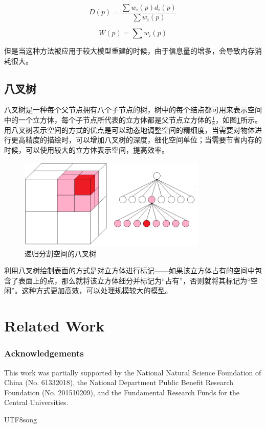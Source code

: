 \documentclass{llncs}
\begin{document}
\begin{CJK}{UTF8}{song}
\begin{equation}
\label{D_cal}
	D(p) = \frac{\sum w_i(p)d_i(p)}{\sum w_i(p)}
\end{equation}

\begin{equation}
\label{W_cal}
	W(p) = \sum w_i(p)
\end{equation}

但是当这种方法被应用于较大模型重建的时候，由于信息量的增多，会导致内存消耗很大。






\subsection{八叉树}
八叉树是一种每个父节点拥有八个子节点的树\cite{Wurm2010OctoMap}，树中的每个结点都可用来表示空间中的一个立方体，每个子节点所代表的立方体都是父节点立方体的$\frac{1}{8}$，如图\ref{Octree}所示。用八叉树表示空间的方式的优点是可以动态地调整空间的精细度，当需要对物体进行更高精度的描绘时，可以增加八叉树的深度，细化空间单位；当需要节省内存的时候，可以使用较大的立方体表示空间，提高效率。

\begin{figure}
\centering
\includegraphics[width=0.8\textwidth]{picts/octree.png}
\caption{递归分割空间的八叉树}
\label{Octree}
\end{figure}

利用八叉树绘制表面的方式是对立方体进行标记——如果该立方体占有的空间中包含了表面上的点，那么就将该立方体细分并标记为“占有”，否则就将其标记为“空闲”。这种方式更加高效，可以处理规模较大的模型。

\section{Related Work}


\subsubsection*{Acknowledgements}
This work was partially supported by the National Natural Science Foundation of China (No. 61332018), the National Department Public Benefit Research Foundation (No. 201510209), and the Fundamental Research Funds for the Central Universities.


%

\end{CJK}{UTF8}{song}
\end{document}
